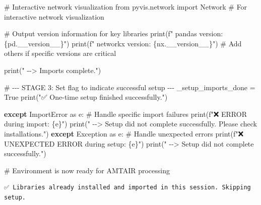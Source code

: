 \documentclass[
  11pt,
  letterpaper,
]{book}
\newenvironment{Shaded}{\begin{snugshade}}{\end{snugshade}}
\newcommand{\BuiltInTok}[1]{\textcolor[rgb]{0.00,0.23,0.31}{#1}}
\newcommand{\CommentTok}[1]{\textcolor[rgb]{0.37,0.37,0.37}{#1}}
\newcommand{\ControlFlowTok}[1]{\textcolor[rgb]{0.00,0.23,0.31}{\textbf{#1}}}
\newcommand{\ImportTok}[1]{\textcolor[rgb]{0.00,0.46,0.62}{#1}}
\newcommand{\NormalTok}[1]{\textcolor[rgb]{0.00,0.23,0.31}{#1}}
\newcommand{\OperatorTok}[1]{\textcolor[rgb]{0.37,0.37,0.37}{#1}}
\newcommand{\PreprocessorTok}[1]{\textcolor[rgb]{0.68,0.00,0.00}{#1}}
\newcommand{\SpecialCharTok}[1]{\textcolor[rgb]{0.37,0.37,0.37}{#1}}
\newcommand{\SpecialStringTok}[1]{\textcolor[rgb]{0.13,0.47,0.30}{#1}}
\newcommand{\StringTok}[1]{\textcolor[rgb]{0.13,0.47,0.30}{#1}}
\newcommand{\VariableTok}[1]{\textcolor[rgb]{0.07,0.07,0.07}{#1}}
\begin{document}
\begin{Shaded}
\begin{Highlighting}[]
        \CommentTok{\# Interactive network visualization}
        \ImportTok{from}\NormalTok{ pyvis.network }\ImportTok{import}\NormalTok{ Network  }\CommentTok{\# For interactive network visualization}

        \CommentTok{\# Output version information for key libraries}
        \BuiltInTok{print}\NormalTok{(}\SpecialStringTok{f"      pandas version: }\SpecialCharTok{\{}\NormalTok{pd}\SpecialCharTok{.}\NormalTok{\_\_version\_\_}\SpecialCharTok{\}}\SpecialStringTok{"}\NormalTok{)}
        \BuiltInTok{print}\NormalTok{(}\SpecialStringTok{f"      networkx version: }\SpecialCharTok{\{}\NormalTok{nx}\SpecialCharTok{.}\NormalTok{\_\_version\_\_}\SpecialCharTok{\}}\SpecialStringTok{"}\NormalTok{)}
        \CommentTok{\# Add others if specific versions are critical}

        \BuiltInTok{print}\NormalTok{(}\StringTok{"   {-}{-}\textgreater{} Imports complete."}\NormalTok{)}

        \CommentTok{\# {-}{-}{-} STAGE 3: Set flag to indicate successful setup {-}{-}{-}}
\NormalTok{        \_setup\_imports\_done }\OperatorTok{=} \VariableTok{True}
        \BuiltInTok{print}\NormalTok{(}\StringTok{"✅ One{-}time setup finished successfully."}\NormalTok{)}

    \ControlFlowTok{except} \PreprocessorTok{ImportError} \ImportTok{as}\NormalTok{ e:}
        \CommentTok{\# Handle specific import failures}
        \BuiltInTok{print}\NormalTok{(}\SpecialStringTok{f"❌ ERROR during import: }\SpecialCharTok{\{}\NormalTok{e}\SpecialCharTok{\}}\SpecialStringTok{"}\NormalTok{)}
        \BuiltInTok{print}\NormalTok{(}\StringTok{"   {-}{-}\textgreater{} Setup did not complete successfully. Please check installations."}\NormalTok{)}
    \ControlFlowTok{except} \PreprocessorTok{Exception} \ImportTok{as}\NormalTok{ e:}
        \CommentTok{\# Handle unexpected errors}
        \BuiltInTok{print}\NormalTok{(}\SpecialStringTok{f"❌ UNEXPECTED ERROR during setup: }\SpecialCharTok{\{}\NormalTok{e}\SpecialCharTok{\}}\SpecialStringTok{"}\NormalTok{)}
        \BuiltInTok{print}\NormalTok{(}\StringTok{"   {-}{-}\textgreater{} Setup did not complete successfully."}\NormalTok{)}

\CommentTok{\# Environment is now ready for AMTAIR processing}
\end{Highlighting}
\end{Shaded}

\begin{verbatim}
✅ Libraries already installed and imported in this session. Skipping setup.
\end{verbatim}
\end{document}
